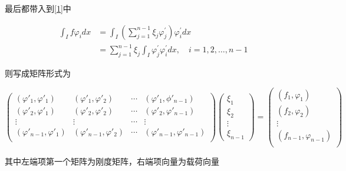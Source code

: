 \documentclass{article}
\begin{document}
最后都带入到\ref{1}中　

\begin{equation}
\begin{aligned}
\int_{I} f \varphi_{i} d x &=\int_{I}\left(\sum_{j=1}^{n-1} \xi_{j} \varphi_{j}^{\prime}\right) \varphi_{i}^{\prime} d x \\
&=\sum_{j=1}^{n-1} \xi_{j} \int_{I} \varphi_{j}^{\prime} \varphi_{i}^{\prime} d x, \quad i=1,2, \ldots, n-1
\end{aligned}
\end{equation}

则写成矩阵形式为

\begin{equation}
	\begin{pmatrix}
		(\varphi'_1, \varphi'_1) & (\varphi'_1, \varphi'_2) & \cdots & (\varphi'_1, \phi'_{n-1}) \\
		(\varphi'_2, \varphi'_1) & (\varphi'_2, \varphi'_2) & \cdots & (\varphi'_2, \varphi'_{n-1}) \\
		\vdots & \vdots & \cdots & \vdots \\
	    (\varphi'_{n-1}, \varphi'_1) & (\varphi'_{n-1}, \varphi'_2) & \cdots & (\varphi'_{n-1}, \varphi'_{n-1}) \\
	\end{pmatrix}
	\begin{pmatrix}
		\xi_1 \\
		\xi_2 \\
		\vdots \\
		\xi_{n-1}
	\end{pmatrix} 
	= \begin{pmatrix}
		(f_1, \varphi_1) \\
		(f_2, \varphi_2) \\
		\vdots \\
		(f_{n-1}, \varphi_{n-1}) \\
	\end{pmatrix}
\end{equation}

其中左端项第一个矩阵为刚度矩阵，右端项向量为载荷向量
\end{document}
